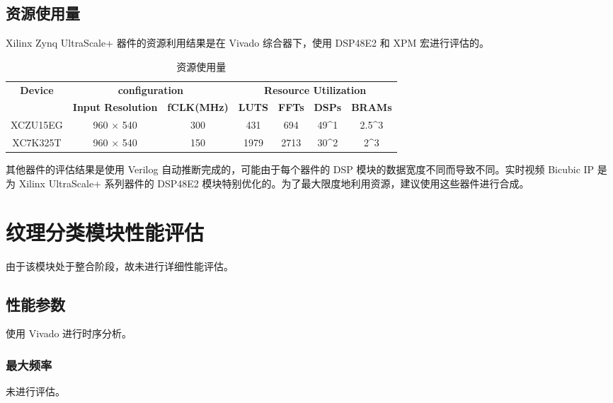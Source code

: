\documentclass[12pt, a4paper, oneside]{ctexbook}
\begin{document}
	\section{资源使用量}
	Xilinx Zynq UltraScale+ 器件的资源利用结果是在 Vivado 综合器下，使用 DSP48E2 和 XPM 宏进行评估的。\par	
	\begin{table}[h]
		\begin{tabular}{|c|cc|cccc|}
			\hline
			\multirow{2}{*}{\textbf{Device}} & \multicolumn{2}{c|}{\textbf{configuration}}                         & \multicolumn{4}{c|}{\textbf{Resource Utilization}}                                                                                            \\ \cline{2-7} 
			& \multicolumn{1}{c|}{\textbf{Input Resolution}} & \textbf{fCLK(MHz)} & \multicolumn{1}{c|}{\textbf{LUTS}} & \multicolumn{1}{c|}{\textbf{FFTs}} & \multicolumn{1}{c|}{\textbf{DSPs}}         & \textbf{BRAMs}         \\ \hline
			XCZU15EG                         & \multicolumn{1}{c|}{960 × 540}                 & 300                & \multicolumn{1}{c|}{431}           & \multicolumn{1}{c|}{694}           & \multicolumn{1}{c|}{49\textasciicircum{}1} & 2.5\textasciicircum{}3 \\ \hline
			XC7K325T                         & \multicolumn{1}{c|}{960 × 540}                 & 150                & \multicolumn{1}{c|}{1979}          & \multicolumn{1}{c|}{2713}          & \multicolumn{1}{c|}{30\textasciicircum{}2} & 2\textasciicircum{}3   \\ \hline
		\end{tabular}
	\caption{资源使用量}
	\end{table}
	其他器件的评估结果是使用 Verilog 自动推断完成的，可能由于每个器件的 DSP 模块的数据宽度不同而导致不同。实时视频 Bicubic IP 是为 Xilinx UltraScale+ 系列器件的 DSP48E2 模块特别优化的。为了最大限度地利用资源，建议使用这些器件进行合成。
	
	\chapter{纹理分类模块性能评估}
	由于该模块处于整合阶段，故未进行详细性能评估。
	\section{性能参数}
	使用 Vivado 进行时序分析。
		\subsection{最大频率}
		未进行评估。
\end{document}
